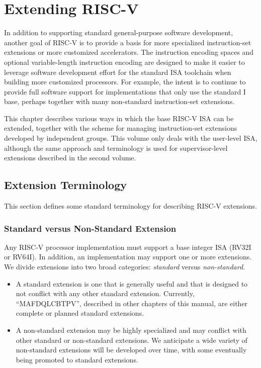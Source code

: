 \chapter{Extending RISC-V}
\label{extensions}

In addition to supporting standard general-purpose software
development, another goal of RISC-V is to provide a basis for more
specialized instruction-set extensions or more customized
accelerators.  The instruction encoding spaces and optional
variable-length instruction encoding are designed to make it easier to
leverage software development effort for the standard ISA toolchain
when building more customized processors.  For example, the intent is
to continue to provide full software support for implementations that
only use the standard I base, perhaps together with many non-standard
instruction-set extensions.

This chapter describes various ways in which the base RISC-V ISA can
be extended, together with the scheme for managing instruction-set
extensions developed by independent groups.  This volume only deals
with the user-level ISA, although the same approach and terminology is
used for supervisor-level extensions described in the second volume.

\section{Extension Terminology}

This section defines some standard terminology for describing RISC-V
extensions.
\vspace{-0.2in}
\subsection*{Standard versus Non-Standard Extension}

Any RISC-V processor implementation must support a base integer ISA
(RV32I or RV64I).  In addition, an implementation may support one or
more extensions.  We divide extensions into two broad categories: {\em
  standard} versus {\em non-standard}.
\begin{itemize}
\item A standard extension is one that is generally useful and that is
  designed to not conflict with any other standard extension.
  Currently, ``MAFDQLCBTPV'', described in other chapters of this
  manual, are either complete or planned standard extensions.
\item A non-standard extension may be highly specialized and may
  conflict with other standard or non-standard extensions.  We
  anticipate a wide variety of non-standard extensions will be
  developed over time, with some eventually being promoted to standard
  extensions.
\end{itemize}

